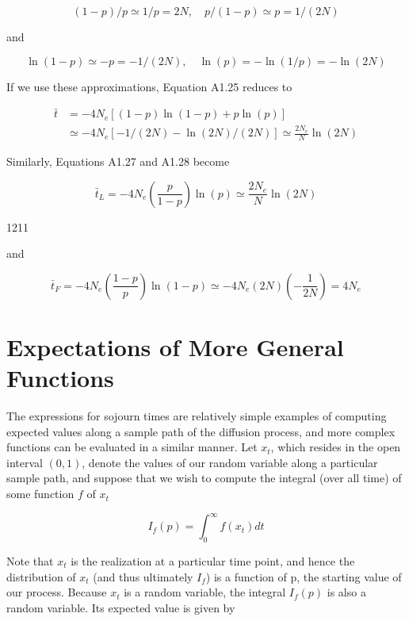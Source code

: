 \documentclass{article}
\begin{document}
\begin{equation}
(1-p)/p\simeq1/p=2N,\quad p/(1-p)\simeq p=1/(2N)
\end{equation}

and

\begin{equation}
\ln(1-p)\simeq-p=-1/(2N),\quad\ln(p)=-\ln(1/p)=-\ln(2N)
\end{equation}

If we use these approximations, Equation A1.25 reduces to

\begin{equation}
\begin{aligned}\bar{t}&=-4N_{e}[\left(1-p\right)\ln(1-p)+p\ln(p)]\\&\simeq-4N_{e}\left[-1/(2N)-\ln(2N)/(2N)\right]\simeq\frac{2N_{e}}{N}\ln(2N)\end{aligned}
\end{equation}

Similarly, Equations A1.27 and A1.28 become

\begin{equation}
\bar{t}_{L}=-4N_{e}\left(\frac{p}{1-p}\right)\ln(p)\simeq\frac{2N_{e}}{N}\ln(2N)
\end{equation}

1211

and

\begin{equation}
\bar{t}_{F}=-4N_{e}\left(\frac{1-p}{p}\right)\ln(1-p)\simeq-4N_{e}(2N)\left(-\frac{1}{2N}\right)=4N_{e}
\end{equation}

\section{Expectations of More General Functions}
The expressions for sojourn times are relatively simple examples of computing expected values along a sample path of the diffusion process, and more complex functions can be evaluated in a similar manner. Let  $ x_t $, which resides in the open interval  $ (0,1) $, denote the values of our random variable along a particular sample path, and suppose that we wish to compute the integral (over all time) of some function  $ f $ of  $ x_t $

\begin{equation}
I_{f}(p)=\int_{0}^{\infty}f(x_{t})dt
\end{equation}

Note that  $ x_{t} $ is the realization at a particular time point, and hence the distribution of  $ x_{t} $ (and thus ultimately  $ I_{f} $) is a function of p, the starting value of our process. Because  $ x_{t} $ is a random variable, the integral  $ I_{f}(p) $ is also a random variable. Its expected value is given by
\end{document}
